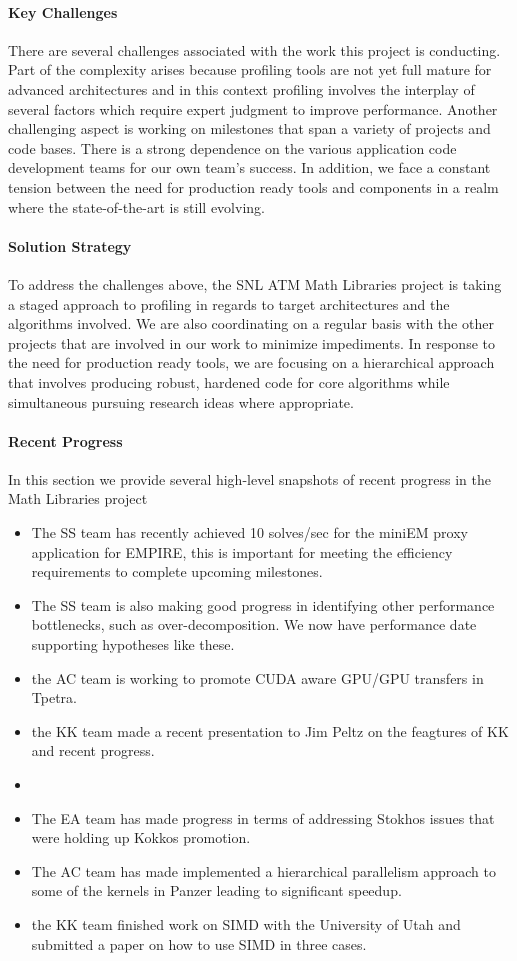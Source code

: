 \paragraph{Key  Challenges}
There are several challenges associated with the work this project is conducting. Part of the complexity arises because profiling tools are not yet full mature for advanced architectures and in this context profiling involves the interplay of several factors which require expert judgment to improve performance.  Another challenging aspect is working on milestones that span a variety of projects and code bases. There is a strong dependence on the various application code development teams for our own team's success. In addition, we face a constant tension between the need for production ready tools and components in a realm where the state-of-the-art is still evolving.

\paragraph{Solution Strategy}
To address the challenges above, the SNL ATM Math Libraries project is taking a staged approach to profiling in regards to target architectures and the algorithms involved. We are also coordinating on a regular basis with the other projects that are involved in our work to minimize impediments. In response to the need for production ready tools, we are focusing on a hierarchical approach that involves producing robust, hardened code for core algorithms while simultaneous pursuing research ideas where appropriate.

\paragraph{Recent Progress}
In this section we provide several high-level snapshots of recent progress in the Math Libraries project
\begin{itemize}
\item The SS team has recently achieved 10 solves/sec for the miniEM proxy application for EMPIRE, this is important for meeting the efficiency requirements to complete upcoming milestones.
\item The SS team is also making good progress in identifying other performance bottlenecks, such as over-decomposition. We now have performance date supporting hypotheses like these.
\item the AC team is working to promote CUDA aware GPU/GPU transfers in Tpetra.
\item the KK team made a recent presentation to Jim Peltz on the feagtures of KK and recent progress.
\item 
\item The EA team has made progress in terms of addressing Stokhos issues that were holding up Kokkos promotion.
\item The AC team has made implemented a hierarchical parallelism approach to some of the kernels in Panzer leading to significant speedup.
\item the KK team finished work on SIMD with the University of Utah and submitted a paper on how to use SIMD in three cases.
\end{itemize}

